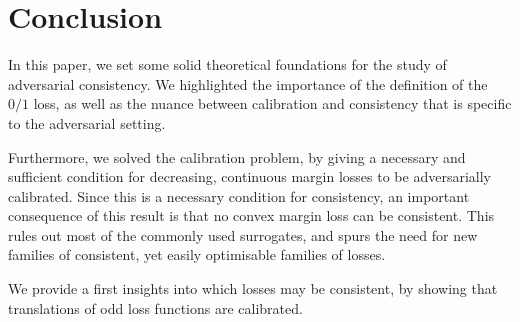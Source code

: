 \section{Conclusion}
In this paper, we set some solid theoretical foundations for the study of adversarial consistency. We highlighted the importance of the definition of the $0/1$ loss, as well as the nuance between calibration and consistency that is specific to the adversarial setting.

Furthermore, we solved the calibration problem, by giving a necessary and sufficient condition for decreasing, continuous margin losses to be adversarially calibrated. Since this is a necessary condition for consistency, an important consequence of this result is that no convex margin loss can be consistent. This rules out most of the commonly used surrogates, and spurs the need for new families of consistent, yet easily optimisable families of losses.

We provide a first insights into which losses may be consistent, by showing that translations of odd loss functions are calibrated.